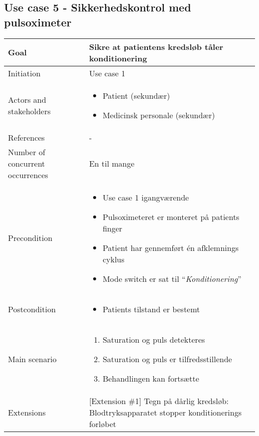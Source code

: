 	\subsection{Use case 5 - Sikkerhedskontrol med pulsoximeter}
		\begin{center}
			\begin{tabular}{ | m{4cm} | m{8cm}| } 
				\hline
				Goal& Sikre at patientens kredsløb tåler konditionering \\ 
				\hline
				Initiation &  Use case 1\\
				\hline
				Actors and stakeholders & 
				\begin{itemize}
					\item Patient (sekundær)
					\item Medicinsk personale (sekundær)
				\end{itemize} \\ 
				\hline
				References & - \\ 
				\hline
				Number of concurrent occurrences & En til mange \\ 
				\hline	
				Precondition & 
				\begin{itemize}
					\item Use case 1 igangværende
					\item Pulsoximeteret er monteret på patients finger
					\item Patient har gennemført én afklemnings cyklus
					\item Mode switch er sat til “\textit{Konditionering}”
 				\end{itemize} \\ 
				\hline
				Postcondition & 
				\begin{itemize}
					\item Patients tilstand er bestemt 
				\end{itemize} \\ 
				\hline
				Main scenario & \begin{enumerate}
					\setlength\itemsep{0cm} %
					\item Saturation og puls detekteres
					\item Saturation og puls er tilfredsstillende
					\subitem [Extension \#1]
					\item Behandlingen kan fortsætte
				\end{enumerate} \\ 
				\hline
				Extensions &  [Extension \#1] Tegn på dårlig kredsløb: Blodtryksapparatet stopper konditionerings forløbet \\ 
				\hline
			\end{tabular}
		\end{center}